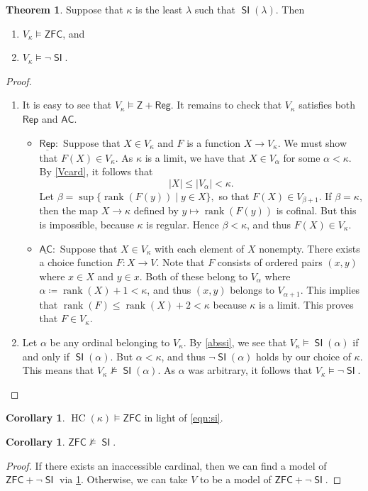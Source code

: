 \documentclass[10pt,letterpaper,cm]{nupset}
\theoremstyle{definition}
\theoremstyle{theorem}
\newtheorem{theorem}[definition]{Theorem}
\newtheorem{corollary}[definition]{Corollary}
\theoremstyle{remark}
\newcommand{\1}{\mathbf{1}}
\newcommand{\0}{\vec 0}
\newcommand{\z}{\mathsf{Z}}
\newcommand{\zfc}{\mathsf{ZFC}}
\newcommand{\ac}{\mathsf{AC}}
\DeclareMathOperator{\si}{\mathsf{SI}}
\DeclareMathOperator{\rnk}{rank}
\DeclareMathOperator{\hc}{HC}
\newcommand{\bi}{\begin{itemize}}
\newcommand{\ei}{\end{itemize}}
\newcommand{\be}{\begin{enumerate}}
\newcommand{\ee}{\end{enumerate}}
\begin{document}
\begin{theorem}\label{sin}
Suppose that $\kappa$ is the least $\lambda$ such that $\si(\lambda)$. Then
\be[label=(\alph*)]
\item $V_{\kappa} \models \zfc$, and 
\item $V_{\kappa} \models \neg{\si}$.
\ee
\end{theorem}
\begin{proof} $ $
\be[label=(\alph*)]
\item It is easy to see that $V_{\kappa} \models \z + \mathsf{Reg}$. It remains to check that $V_{\kappa}$ satisfies both $\mathsf{Rep}$ and $\ac$.
\bi
\item $\underline{\mathsf{Rep}}:$  Suppose that $X\in V_{\kappa}$ and $F$ is a function $X \to V_{\kappa}$. We must show that $F(X) \in V_{\kappa}$. As $\kappa$ is a limit, we have that $X\in V_{\alpha}$ for some $\alpha < \kappa$. By \cref{Vcard}, it follows that $$\lvert{X}\rvert \leq \lvert{V_{\alpha}}\rvert < \kappa.$$ Let $\beta = \sup\{\rnk(F(y)) \mid y\in X\},$ so that $F(X)\in V_{\beta + 1}$. If $\beta = \kappa$, then the map $X \to \kappa$ defined by $y \mapsto \rnk(F(y))$ is cofinal. But this is impossible, because $\kappa$ is regular. Hence $\beta <\kappa$, and thus $F(X) \in V_{\kappa}$.

\item $\underline{\ac}:$ Suppose that $X\in V_{\kappa}$ with each element of $X$ nonempty. There exists a choice function $F: X \to V$. Note that $F$ consists of ordered pairs $\left(x,y\right)$ where $x\in X$ and $y\in x$. Both of these belong to $V_{\alpha}$ where $\alpha \coloneqq \rnk(X) +1<\kappa$, and thus $\left(x,y\right)$ belongs to  $V_{\alpha+1}$. This implies that $\rnk(F) \leq \rnk(X)+2 <\kappa$ because $\kappa$ is a limit. This proves that $F\in V_{\kappa}$.
\ei
\item Let $\alpha$ be any ordinal belonging to $V_{\kappa}$. By \cref{abssi}, we see that $V_{\kappa} \models \si(\alpha)$ if and only if $\si(\alpha)$. But $\alpha < \kappa$, and thus $\neg{\si(\alpha)}$ holds by our choice of $\kappa$. This means that $V_{\kappa} \not\models \si(\alpha)$. As $\alpha$ was arbitrary, it follows that $V_{\kappa}\models \neg{\si}$.
\ee
\end{proof}

\begin{corollary}
$\hc(\kappa) \models \zfc$ in light of \eqref{eqn:si}.
\end{corollary}

\begin{corollary}\label{sina}
$\zfc \nvDash \si$.
\end{corollary}
\begin{proof}
If there exists an inaccessible cardinal, then we can find a model of $\zfc + \neg{\si}$ via \cref{sin}. Otherwise, we can take $V$ to be a model of $\zfc + \neg{\si}$.
\end{proof}
\end{document}
